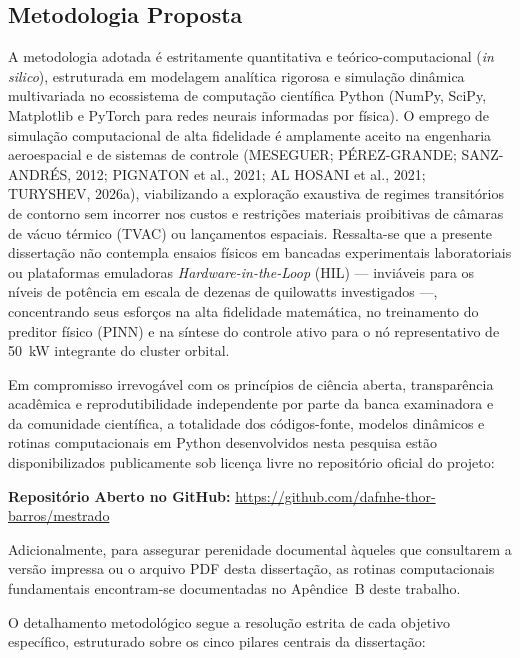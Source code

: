 \subsection{Metodologia Proposta}

A metodologia adotada é estritamente quantitativa e teórico-computacional (\textit{in silico}), estruturada em modelagem analítica rigorosa e simulação dinâmica multivariada no ecossistema de computação científica Python (NumPy, SciPy, Matplotlib e PyTorch para redes neurais informadas por física). O emprego de simulação computacional de alta fidelidade é amplamente aceito na engenharia aeroespacial e de sistemas de controle (MESEGUER; PÉREZ-GRANDE; SANZ-ANDRÉS, 2012; PIGNATON et al., 2021; AL HOSANI et al., 2021; TURYSHEV, 2026a), viabilizando a exploração exaustiva de regimes transitórios de contorno sem incorrer nos custos e restrições materiais proibitivas de câmaras de vácuo térmico (TVAC) ou lançamentos espaciais. Ressalta-se que a presente dissertação não contempla ensaios físicos em bancadas experimentais laboratoriais ou plataformas emuladoras \textit{Hardware-in-the-Loop} (HIL) --- inviáveis para os níveis de potência em escala de dezenas de quilowatts investigados ---, concentrando seus esforços na alta fidelidade matemática, no treinamento do preditor físico (PINN) e na síntese do controle ativo para o nó representativo de 50~kW integrante do cluster orbital.

Em compromisso irrevogável com os princípios de ciência aberta, transparência acadêmica e reprodutibilidade independente por parte da banca examinadora e da comunidade científica, a totalidade dos códigos-fonte, modelos dinâmicos e rotinas computacionais em Python desenvolvidos nesta pesquisa estão disponibilizados publicamente sob licença livre no repositório oficial do projeto:
\begin{center}
    \textbf{Repositório Aberto no GitHub:} \url{https://github.com/dafnhe-thor-barros/mestrado}
\end{center}
Adicionalmente, para assegurar perenidade documental àqueles que consultarem a versão impressa ou o arquivo PDF desta dissertação, as rotinas computacionais fundamentais encontram-se documentadas no Apêndice~B deste trabalho.

O detalhamento metodológico segue a resolução estrita de cada objetivo específico, estruturado sobre os cinco pilares centrais da dissertação:

